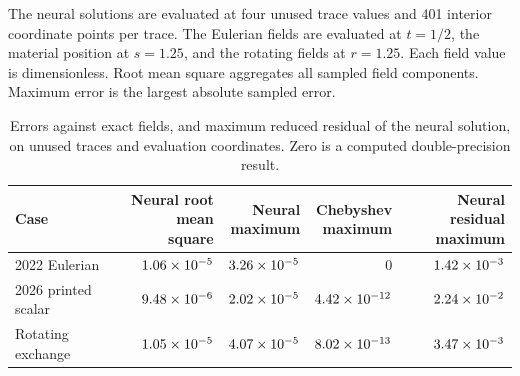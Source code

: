 \documentclass[12pt,a4paper,oneside]{report}
\numberwithin{equation}{chapter}
\theoremstyle{remark}\newtheorem{remark}[theorem]{Remark}
\begin{document}
The neural solutions are evaluated at four unused trace values and 401 interior coordinate points per trace. The Eulerian fields are evaluated at $t=1/2$, the material position at $s=1.25$, and the rotating fields at $r=1.25$. Each field value is dimensionless. Root mean square aggregates all sampled field components. Maximum error is the largest absolute sampled error.
\begin{table}[htb]\centering\small
\begin{tabular}{@{}lrrrr@{}}\toprule
Case & \shortstack{Neural root\\mean square} & \shortstack{Neural\\maximum} & \shortstack{Chebyshev\\maximum} & \shortstack{Neural residual\\maximum}\\\midrule
2022 Eulerian & $1.06\times 10^{-5}$ & $3.26\times 10^{-5}$ & $0$ & $1.42\times 10^{-3}$\\
2026 printed scalar & $9.48\times 10^{-6}$ & $2.02\times 10^{-5}$ & $4.42\times 10^{-12}$ & $2.24\times 10^{-2}$\\
Rotating exchange & $1.05\times 10^{-5}$ & $4.07\times 10^{-5}$ & $8.02\times 10^{-13}$ & $3.47\times 10^{-3}$\\
\bottomrule\end{tabular}
\caption[Three invariant benchmark comparisons]{Errors against exact fields, and maximum reduced residual of the neural solution, on unused traces and evaluation coordinates. Zero is a computed double-precision result.}
\label{tab:new-results}
\end{table}
\end{document}
